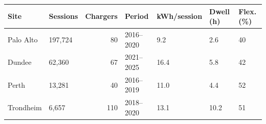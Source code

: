 \begin{tabular}{llrllll}
\toprule
Site & Sessions & Chargers & Period & kWh/session & Dwell (h) & Flex. (\%) \\
\midrule
Palo Alto & 197,724 & 80 & 2016--2020 & 9.2 & 2.6 & 40 \\
Dundee & 62,360 & 67 & 2021--2025 & 16.4 & 5.8 & 42 \\
Perth & 13,281 & 40 & 2016--2019 & 11.0 & 4.4 & 52 \\
Trondheim & 6,657 & 110 & 2018--2020 & 13.1 & 10.2 & 51 \\
\bottomrule
\end{tabular}
